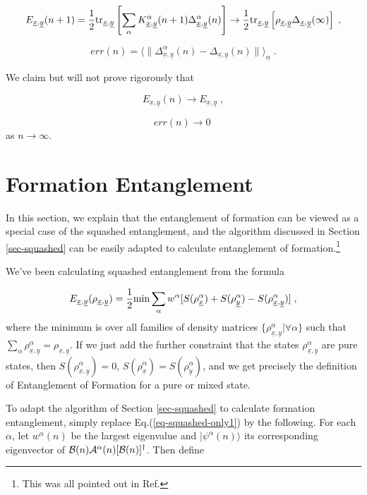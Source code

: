 \documentclass[12pt]{article}%
\newcommand{\ket}[1]{|#1\rangle}
\newcommand{\av}[1]{\langle#1\rangle}
\newcommand{\tr}[0]{{\rm tr }}
\newcommand{\beq}{\begin{equation}}
\newcommand{\eeq}{\end{equation}}
\newcommand{\rarrow}[0]{\rightarrow}
\newcommand{\ul}[1]{\underline{#1}}
\newcommand{\rvx}[0]{{\ul{x}}}
\newcommand{\rvy}[0]{{\ul{y}}}
\newcommand{\cala}[0]{{\cal A}}
\newcommand{\calb}[0]{{\cal B}}
\newcommand{\rvalp}[0]{{\ul{\alpha}}}
\newcommand{\alp}[0]{{\alpha}}
\begin{document}
\beq
E_{\rvx, \rvy}(n+1) =
\frac{1}{2}\tr_{\rvx, \rvy} \left[
\sum_\alp K^\alp _{\rvx, \rvy}(n+1)
\Delta^\alp_{\rvx, \rvy}(n)\right]
\rarrow \frac{1}{2}\tr_{\rvx, \rvy} \left[\rho_{\rvx, \rvy}\Delta_{\rvx, \rvy}(\infty)\right]
\;,
\eeq

\beq
err(n)=
\av{\|\Delta^\alp_{\rvx, \rvy}(n)-\Delta_{\rvx, \rvy}(n)\|}_\rvalp
\;.
\eeq


We claim but will not prove rigorously that

\beq
E_{\rvx, \rvy}(n)\rightarrow
E_{\rvx, \rvy}
\;,
\eeq

\beq
err(n)\rightarrow 0
\;
\eeq
as $n\rightarrow \infty$.




















\section{Formation Entanglement}

In this section, we explain that the entanglement of formation
can be viewed as a special case of the squashed
entanglement, and the algorithm discussed in Section
\ref{sec-squashed} can be easily
adapted to calculate entanglement of formation.\footnote{This was all pointed out
in Ref.\cite{ab-algo}}

We've been calculating squashed entanglement from the formula

\beq
E_{\rvx, \rvy}(\rho_{\rvx, \rvy})=
\frac{1}{2}
{\rm min}\sum_\alp w^\alp [
S(\rho^\alp_{\rvx})
+S(\rho^\alp_{\rvy})
-S(\rho^\alp_{\rvx, \rvy})]
\;,
\eeq
where the minimum is over all
families of density matrices
$\{\rho^\alp_{\rvx, \rvy}|\forall \alp\}$
such that $\sum_\alp \rho^\alp_{\rvx, \rvy}=
\rho_{\rvx, \rvy}$. If we just add
the further constraint that
the states $\rho^\alp_{\rvx, \rvy}$ are pure states, then
$S(\rho^\alp_{\rvx, \rvy})=0$,
$S(\rho^\alp_{\rvx})=S(\rho^\alp_{\rvy})$,
and we get precisely the definition
of Entanglement of Formation for a pure or mixed state.

To adapt the algorithm of Section \ref{sec-squashed}
to calculate formation entanglement,
simply
replace Eq.(\ref{eq-squashed-only1}) by the following.
For each $\alp$, let $w^\alp(n)$ be the largest eigenvalue
and $\ket{\psi^\alp(n)}$ its corresponding
eigenvector of $\calb(n)
\cala^\alp(n)[\calb(n)]^\dagger$.
Then define
\end{document}
